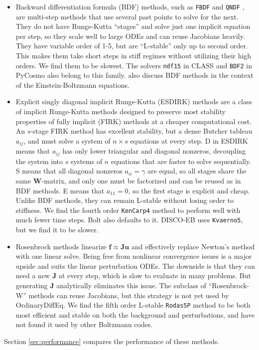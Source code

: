\documentclass{aa}
\begin{document}
\begin{itemize}
\item
Backward differentiation formula (BDF) methods,
such as \texttt{FBDF} and \texttt{QNDF} \citep{shampineMATLABODESuite1997}, are
multi-step methods that use several past points to solve for the next.
They do not have Runge-Kutta \enquote{stages} and solve just one implicit equation per step,
so they scale well to large ODEs and can reuse Jacobians heavily.
They have variable order of 1-5, but are \enquote{L-stable} only up to second order.
This makes them take short steps in stiff regimes without utilizing their high orders.
We find them to be slowest.
The solvers \texttt{ndf15} in CLASS and \texttt{BDF2} in PyCosmo also belong to this family.
\citet{nadkarni-ghoshEinsteinBoltzmannEquationsRevisited2017} also discuss BDF methods in the context of the Einstein-Boltzmann equations.

\item
Explicit singly diagonal implicit Runge-Kutta (ESDIRK) methods \citep[e.g.,][]{jorgensenFamilyESDIRKIntegration2018} are a class of implicit Runge-Kutta methods designed to preserve most stability properties of fully implicit (FIRK) methods at a cheaper computational cost.
An $s$-stage FIRK method has excellent stability, but a dense Butcher tableau $a_{ij}$, and must solve a system of $n \times s$ equations at every step.
D in ESDIRK means that $a_{ij}$ has only lower triangular and diagonal nonzeros, decoupling the system into $s$ systems of $n$ equations that are faster to solve sequentially.
S means that all diagonal nonzeros $a_{ii} = \gamma$ are equal, so all stages share the same $\boldsymbol{W}$-matrix, and only one must be factorized and can be reused as in BDF methods.
E means that $a_{11} = 0$, so the first stage is explicit and cheap.
Unlike BDF methods, they can remain L-stable without losing order to stiffness.
We find the fourth order \texttt{KenCarp4} method \citep{kennedyAdditiveRungeKutta2003} to perform well with much fewer time steps.
Bolt also defaults to it. DISCO-EB uses \texttt{Kvaerno5}, but we find it to be slower.

\item Rosenbrock methods \citep[e.g.,][]{langRosenbrockWannerMethodsConstruction2020} linearize $\boldsymbol{f} \approx \boldsymbol{J} \boldsymbol{u}$ and effectively replace Newton's method with one linear solve.
Being free from nonlinear convergence issues is a major upside and suits the linear perturbation ODEs.
The downside is that they can need a new $\boldsymbol{J}$ at every step, which is slow to evaluate in many problems.
But generating $\boldsymbol{J}$ analytically eliminates this issue.
The subclass of \enquote{Rosenbrock-W} methods can reuse Jacobians, but this strategy is not yet used by OrdinaryDiffEq.
We find the fifth order L-stable \texttt{Rodas5P} method \citep{steinebachConstructionRosenbrockWanner2023} to be both most efficient and stable on both the background and perturbations, and have not found it used by other Boltzmann codes.
\end{itemize}
Section \ref{sec:performance} compares the performance of these methods.
\end{document}
